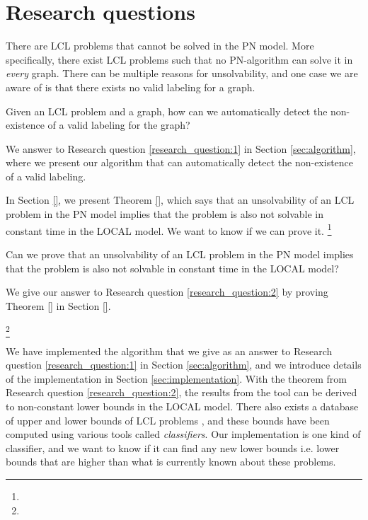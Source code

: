 
\section{Research questions} \label{sec:research_question}

There are LCL problems that cannot be solved in the PN model.
More specifically, there exist LCL problems such that no PN-algorithm can solve it in \emph{every} graph.
There can be multiple reasons for unsolvability, and one case we are aware of is that there exists no valid labeling for a graph.

\begin{researchquestion} \label{research_question:1}
Given an LCL problem and a graph, how can we automatically detect the non-existence of a valid labeling for the graph?
\end{researchquestion}

We answer to Research question \ref{research_question:1} in Section \ref{sec:algorithm}, where we present our algorithm that can automatically detect the non-existence of a valid labeling.

In Section \ref{}, we present Theorem \ref{}, which says that an unsolvability of an LCL problem in the PN model implies that the problem is also not solvable in constant time in the LOCAL model.
We want to know if we can prove it.
\footnote{} %

\begin{researchquestion} \label{research_question:2}
Can we prove that an unsolvability of an LCL problem in the PN model implies that the problem is also not solvable in constant time in the LOCAL model?
\end{researchquestion}

We give our answer to Research question \ref{research_question:2} by proving Theorem \ref{} in Section \ref{}.

\footnote{} %

We have implemented the algorithm that we give as an answer to Research question \ref{research_question:1} in Section \ref{sec:algorithm}, and we introduce details of the implementation in Section \ref{sec:implementation}.
With the theorem from Research question \ref{research_question:2}, the results from the tool can be derived to non-constant lower bounds in the LOCAL model.
There also exists a database of upper and lower bounds of LCL problems \cite{Tereshchenko2021}, and these bounds have been computed using various tools called \emph{classifiers}.
Our implementation is one kind of classifier, and we want to know if it can find any new lower bounds i.e. lower bounds that are higher than what is currently known about these problems.

